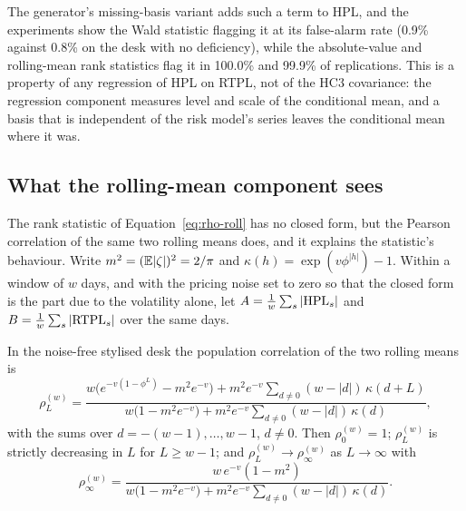 The generator's missing-basis variant adds such a term to HPL, and the experiments show the Wald statistic flagging it at its false-alarm rate (0.9\% against 0.8\% on the desk with no deficiency), while the absolute-value and rolling-mean rank statistics flag it in 100.0\% and 99.9\% of replications.
This is a property of any regression of HPL on RTPL, not of the HC3 covariance: the regression component measures level and scale of the conditional mean, and a basis that is independent of the risk model's series leaves the conditional mean where it was.

\subsection{What the rolling-mean component sees}
\label{sec:theory-rolling}

The rank statistic of Equation~\eqref{eq:rho-roll} has no closed form, but the Pearson correlation of the same two rolling means does, and it explains the statistic's behaviour.
Write $m^2=(\mathbb{E}|\zeta|)^2=2/\pi$ and $\kappa(h)=\exp(v\phi^{|h|})-1$.
Within a window of $w$ days, and with the pricing noise set to zero so that the closed form is the part due to the volatility alone, let $A=\tfrac1w\sum_s|\mathrm{HPL}_s|$ and $B=\tfrac1w\sum_s|\mathrm{RTPL}_s|$ over the same days.

\begin{proposition}
\label{prop:rolling}
In the noise-free stylised desk the population correlation of the two rolling means is
\begin{equation}
\rho_L^{(w)}=\frac{w\bigl(e^{-v(1-\phi^{L})}-m^2e^{-v}\bigr)+m^2e^{-v}\sum_{d\neq0}(w-|d|)\,\kappa(d+L)}{w\bigl(1-m^2e^{-v}\bigr)+m^2e^{-v}\sum_{d\neq0}(w-|d|)\,\kappa(d)},
\label{eq:rolling-corr}
\end{equation}
with the sums over $d=-(w-1),\dots,w-1$, $d\ne0$.
Then $\rho_0^{(w)}=1$; $\rho_L^{(w)}$ is strictly decreasing in $L$ for $L\ge w-1$; and $\rho_L^{(w)}\to\rho_\infty^{(w)}$ as $L\to\infty$ with
\begin{equation}
\rho_\infty^{(w)}=\frac{w\,e^{-v}(1-m^2)}{w\bigl(1-m^2e^{-v}\bigr)+m^2e^{-v}\sum_{d\neq0}(w-|d|)\,\kappa(d)}.
\label{eq:rolling-limit}
\end{equation}
\end{proposition}

